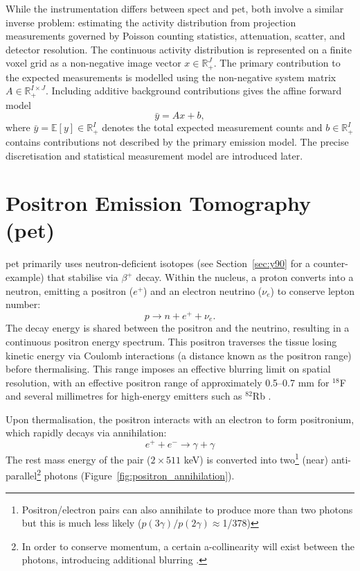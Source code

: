 While the instrumentation differs between \gls{spect} and \gls{pet}, both involve a similar inverse problem: estimating the activity distribution from projection measurements governed by Poisson counting statistics, attenuation, scatter, and detector resolution. The continuous activity distribution is represented on a finite voxel grid as a non-negative image vector $x\in\mathbb{R}_+^J$. The primary contribution to the expected measurements is modelled using the non-negative system matrix $A\in\mathbb{R}_+^{I\times J}$. Including additive background contributions gives the affine forward model
\begin{equation}
\bar{y}=Ax+b,
\end{equation}
where $\bar{y}=\mathbb{E}[y]\in\mathbb{R}_+^I$ denotes the total expected measurement counts and $b\in\mathbb{R}_+^I$ contains contributions not described by the primary emission model. The precise discretisation and statistical measurement model are introduced later.

\section{Positron Emission Tomography (\gls{pet})}\label{sec:pet}

\gls{pet} primarily uses neutron-deficient isotopes (see Section~\ref{sec:y90} for a counter-example)  that stabilise via $\beta^+$ decay. Within the nucleus, a proton converts into a neutron, emitting a positron ($e^+$) and an electron neutrino ($\nu_e$) to conserve lepton number:
\begin{equation}
    p \rightarrow n + e^+ + \nu_e.
\end{equation}
The decay energy is shared between the positron and the neutrino, resulting in a continuous positron energy spectrum. This positron traverses the tissue losing kinetic energy via Coulomb interactions (a distance known as the positron range) before thermalising. This range imposes an effective blurring limit on spatial resolution, with an effective positron range of approximately 0.5–0.7 mm for $^{18}$F and several millimetres for high-energy emitters such as $^{82}$Rb \cite{cherryPhysicsNuclearMedicine2003}.

Upon thermalisation, the positron interacts with an electron to form positronium, which rapidly decays via annihilation:
\begin{equation}
    e^+ + e^- \rightarrow \gamma + \gamma
\end{equation}
The rest mass energy of the pair ($2 \times 511$ keV) is converted into two\footnote{Positron/electron pairs can also annihilate to produce more than two photons but this is much less likely ($p(3\gamma)/p(2\gamma)\approx$1/378)\cite{bass_colloquium_2023}} (near) anti-parallel\footnote{In order to conserve momentum, a certain a-collinearity will exist between the photons, introducing additional blurring \cite{shibuyaAnnihilationPhotonAcollinearity2007}.} photons (Figure~\ref{fig:positron_annihilation}).

